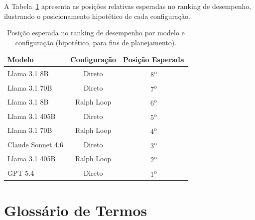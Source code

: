 \documentclass[a4paper,10pt,twocolumn]{article}
\newcommand{\helvetfont}[1]{{\fontfamily{phv}\selectfont #1}}
\begin{document}
A Tabela~\ref{tab:dados-esperados} apresenta as posições relativas esperadas no ranking de desempenho, ilustrando o posicionamento hipotético de cada configuração.

\begin{table}[H]
\centering
\caption{Posição esperada no ranking de desempenho por modelo e configuração (hipotético, para fins de planejamento).}
\label{tab:dados-esperados}
\helvetfont{
\small
\begin{tabular}{lcc}
\toprule
\textbf{Modelo} & \textbf{Configuração} & \textbf{Posição Esperada} \\
\midrule
Llama 3.1 8B   & Direto     & 8\textsuperscript{o} \\
Llama 3.1 70B  & Direto     & 7\textsuperscript{o} \\
Llama 3.1 8B   & Ralph Loop & 6\textsuperscript{o} \\
Llama 3.1 405B & Direto     & 5\textsuperscript{o} \\
Llama 3.1 70B  & Ralph Loop & 4\textsuperscript{o} \\
Claude Sonnet 4.6 & Direto  & 3\textsuperscript{o} \\
Llama 3.1 405B & Ralph Loop & 2\textsuperscript{o} \\
GPT 5.4        & Direto     & 1\textsuperscript{o} \\
\bottomrule
\end{tabular}
}
\end{table}

\section{Glossário de Termos}
\end{document}
